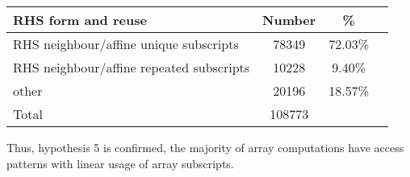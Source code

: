 \begin{center}
\begin{tabular}{l|S[table-format=4]S[table-format=2.2]S[table-format=4]}
\textbf{RHS form and reuse} & \textbf{Number} & \% \\ \hline
RHS neighbour/affine unique subscripts      & 78349     & 72.03\%  \\\hline
RHS neighbour/affine repeated subscripts   & 10228     & 9.40\%  \\\hline
other                             & 20196     & 18.57\%  \\\hline\hline
Total                             & 108773    &
\end{tabular}
\end{center}
%
Thus, hypothesis 5 is confirmed, the majority of array computations
have access patterns with linear usage of array subscripts.

